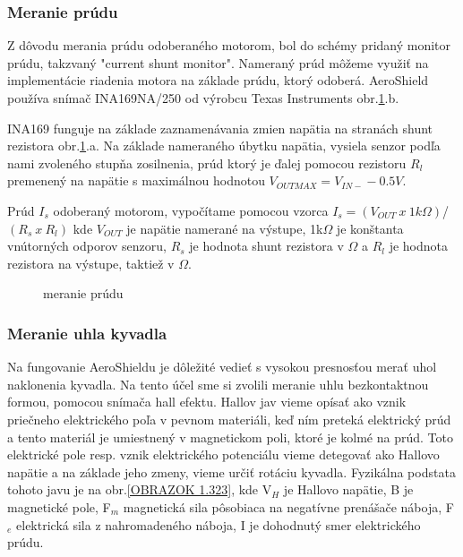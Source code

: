 \subsubsection{Meranie prúdu}
\label{merprud}

Z dôvodu merania prúdu odoberaného motorom, bol do schémy pridaný monitor prúdu, takzvaný "current shunt monitor". Nameraný prúd môžeme využiť na implementácie riadenia motora na základe prúdu, ktorý odoberá. AeroShield používa snímač INA169NA/250 od výrobcu Texas Instruments obr.\ref{OBRAZOK 2.3.2}.b.

INA169 funguje na základe zaznamenávania zmien napätia na stranách shunt rezistora obr.\ref{OBRAZOK 2.3.2}.a. Na základe nameraného úbytku napätia, vysiela senzor podľa nami zvoleného stupňa zosilnenia, prúd ktorý je ďalej pomocou rezistoru $R_{l}$ premenený na napätie s maximálnou hodnotou $V_{OUTMAX} = V_{IN-} - 0.5V $.

Prúd $I_{s}$ odoberaný motorom, vypočítame pomocou vzorca $I_{s} = {(V_{OUT}\: x \: 1k\Omega)}$/${(R_{s} \: x \: R_{l})}$ kde $V_{OUT}$ je napätie namerané na výstupe, 1k$\Omega$ je konštanta vnútorných odporov senzoru, $R_{s}$ je hodnota shunt rezistora v $\Omega$ a $R_{l}$ je hodnota rezistora na výstupe, taktiež v $\Omega$\cite{INA}.

\begin{figure}[!tbh]
	\hfill
	\hfill
	\hfill
	\caption{meranie prúdu}\label{OBRAZOK 2.3.2}
\end{figure}





\subsubsection{Meranie uhla kyvadla}
\label{meruhl}

Na fungovanie AeroShieldu je dôležité vedieť s vysokou presnosťou merať uhol naklonenia kyvadla. Na tento účel sme si zvolili meranie uhlu bezkontaktnou formou, pomocou snímača hall efektu. Hallov jav vieme opísať ako vznik priečneho elektrického poľa v pevnom materiáli, keď ním preteká elektrický prúd a tento materiál je umiestnený v magnetickom poli, ktoré je kolmé na prúd\cite{Hall}. Toto elektrické pole resp. vznik elektrického potenciálu vieme detegovať ako Hallovo napätie a na základe jeho zmeny, vieme určiť rotáciu kyvadla. Fyzikálna podstata tohoto javu je na obr.\ref{OBRAZOK 1.323}, kde V$_H$ je Hallovo napätie, B je magnetické pole, F$_m$ magnetická sila pôsobiaca na negatívne prenášače náboja, F$_e$ elektrická sila z nahromadeného náboja, I je dohodnutý smer elektrického prúdu. 

